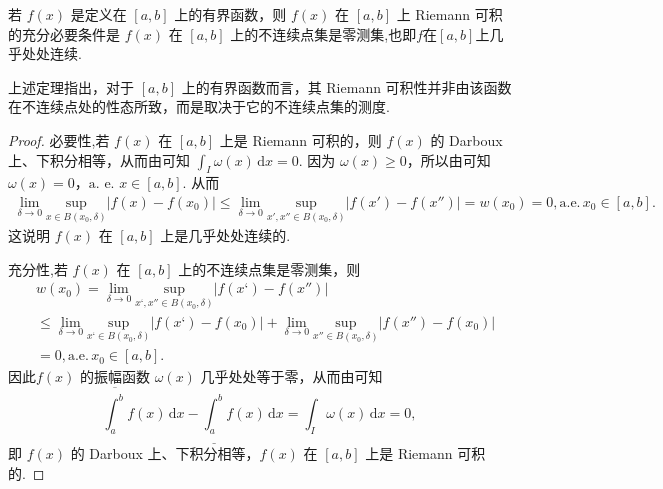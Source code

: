 \documentclass[../../main.tex]{subfiles}%
\begin{document}
\begin{theorem}\label{theorem:定理4.24}
若 \( f(x) \) 是定义在 \( [a,b] \) 上的有界函数，则 \( f(x) \) 在 \( [a,b] \) 上 Riemann 可积的充分必要条件是 \( f(x) \) 在 \( [a,b] \) 上的不连续点集是零测集,也即$f$在$[a,b]$上几乎处处连续.
\end{theorem}
\begin{remark}
上述定理指出，对于 \( [a,b] \) 上的有界函数而言，其 Riemann 可积性并非由该函数在不连续点处的性态所致，而是取决于它的不连续点集的测度.
\end{remark}
\begin{proof}

必要性,若 \( f(x) \) 在 \( [a,b] \) 上是 Riemann 可积的，则 \( f(x) \) 的 Darboux 上、下积分相等，从而由可知 \( \int_I \omega(x) \, \mathrm{d}x = 0 \). 因为 \( \omega(x) \geqslant  0 \)，所以由可知\( \omega(x) = 0 \)，\(\text{a. e.}\) \( x \in [a,b] \). 从而
\begin{align*}
\underset{\delta \rightarrow 0}{\lim}\underset{x\in B\left( x_0,\delta \right)}{\mathrm{sup}}|f(x)-f(x_0)|\leqslant \underset{\delta \rightarrow 0}{\lim}\underset{x',x'' \in B\left( x_0,\delta \right)}{\mathrm{sup}}|f\left( x' \right) -f\left( x'' \right) |=w(x_0)=0,\mathrm{a}.\mathrm{e}.\,x_0\in \left[ a,b \right] .
\end{align*}
这说明 \( f(x) \) 在 \( [a,b] \) 上是几乎处处连续的.

充分性,若 \( f(x) \) 在 \( [a,b] \) 上的不连续点集是零测集，则
\begin{align*}
&w(x_0)=\underset{\delta \rightarrow 0}{\lim}\underset{x‘,x'' \in B\left( x_0,\delta \right)}{\mathrm{sup}}|f\left( x‘\right) -f\left( x'' \right) |
\\
&\leqslant \underset{\delta \rightarrow 0}{\lim}\underset{x‘\in B\left( x_0,\delta \right)}{\mathrm{sup}}|f(x‘)-f(x_0)|+\underset{\delta \rightarrow 0}{\lim}\underset{x'' \in B\left( x_0,\delta \right)}{\mathrm{sup}}|f(x'' )-f(x_0)|
\\
&=0,\mathrm{a}.\mathrm{e}.\,x_0\in \left[ a,b \right] .
\end{align*}
因此\( f(x) \) 的振幅函数 \( \omega(x) \) 几乎处处等于零，从而由可知
\[
\overline{\int_a^b} f(x) \, \mathrm{d}x - \underline{\int_a^b} f(x) \, \mathrm{d}x = \int_I \omega(x) \, \mathrm{d}x = 0,
\]
即 \( f(x) \) 的 Darboux 上、下积分相等，\( f(x) \) 在 \( [a,b] \) 上是 Riemann 可积的.

\end{proof}
\end{document}
